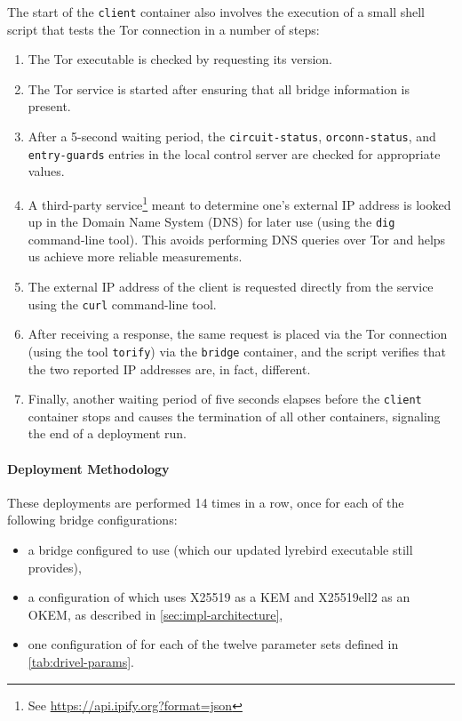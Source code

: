 The start of the \texttt{client} container also involves the execution of a small shell script that tests the Tor connection in a number of steps:
\begin{enumerate}
    \item The Tor executable is checked by requesting its version.
    
    \item The Tor service is started after ensuring that all bridge information is present.
    
    \item After a 5-second waiting period, the \texttt{circuit-status}, \texttt{orconn-status}, and \texttt{entry-guards} entries in the local control server are checked for appropriate values.
    
    \item A third-party service\footnote{See \url{https://api.ipify.org?format=json}} meant to determine one's external IP address is looked up in the Domain Name System (DNS) for later use (using the \texttt{dig} command-line tool). This avoids performing DNS queries over Tor and helps us achieve more reliable measurements.
    
    \item The external IP address of the client is requested directly from the service using the \texttt{curl} command-line tool.
    
    \item After receiving a response, the same request is placed via the Tor connection (using the tool \texttt{torify}) via the \texttt{bridge} container, and the script verifies that the two reported IP addresses are, in fact, different.
    
    \item Finally, another waiting period of five seconds elapses before the \texttt{client} container stops and causes the termination of all other containers, signaling the end of a deployment run.
\end{enumerate}

\paragraph{Deployment Methodology}
These deployments are performed 14 times in a row, once for each of the following bridge configurations:
\begin{itemize}
    \item a bridge configured to use \obfsfour{} (which our updated lyrebird executable still provides),
    \item a configuration of \drivel{} which uses X25519 as a KEM and X25519ell2 as an OKEM, as described in \cref{sec:impl-architecture},
    \item one configuration of \drivel{} for each of the twelve parameter sets defined in \cref{tab:drivel-params}.
\end{itemize}

